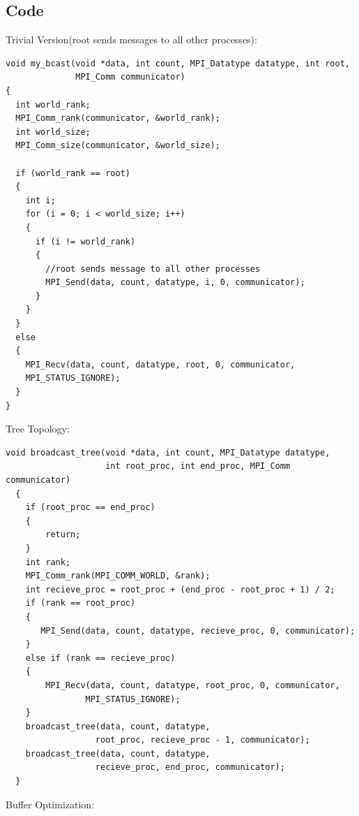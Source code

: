 \documentclass[article]{scrartcl}
\begin{document}
\subsection{Code}
Trivial Version(root sends messages to all other processes):
\begin{lstlisting}[frame=single]
void my_bcast(void *data, int count, MPI_Datatype datatype, int root,
              MPI_Comm communicator)
{
  int world_rank;
  MPI_Comm_rank(communicator, &world_rank);
  int world_size;
  MPI_Comm_size(communicator, &world_size);

  if (world_rank == root)
  {
    int i;
    for (i = 0; i < world_size; i++)
    {
      if (i != world_rank)
      {
        //root sends message to all other processes
        MPI_Send(data, count, datatype, i, 0, communicator);
      }
    }
  }
  else
  {
    MPI_Recv(data, count, datatype, root, 0, communicator,
    MPI_STATUS_IGNORE);
  }
}
\end{lstlisting}
Tree Topology:
\begin{lstlisting}[frame=single]
void broadcast_tree(void *data, int count, MPI_Datatype datatype, 
                    int root_proc, int end_proc, MPI_Comm communicator)
  {
    if (root_proc == end_proc)
    {
        return;
    }
    int rank;
    MPI_Comm_rank(MPI_COMM_WORLD, &rank);
    int recieve_proc = root_proc + (end_proc - root_proc + 1) / 2;
    if (rank == root_proc)
    {
       MPI_Send(data, count, datatype, recieve_proc, 0, communicator);
    }
    else if (rank == recieve_proc)
    {
        MPI_Recv(data, count, datatype, root_proc, 0, communicator, 
                MPI_STATUS_IGNORE);
    }
    broadcast_tree(data, count, datatype, 
                  root_proc, recieve_proc - 1, communicator);
    broadcast_tree(data, count, datatype, 
                  recieve_proc, end_proc, communicator);
  }
\end{lstlisting}
Buffer Optimization:
\end{document}
